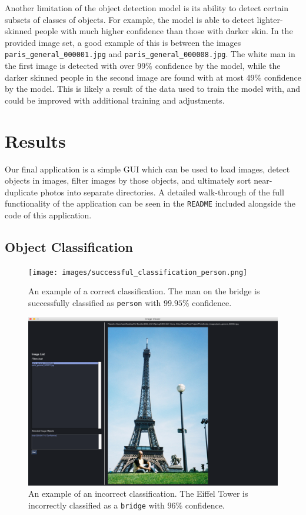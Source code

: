 \documentclass[12pt]{article}
\begin{document}
	Another limitation of the object detection model is its ability to detect certain subsets of classes of objects. For example, the model is able to detect lighter-skinned people with much higher confidence than those with darker skin. In the provided image set, a good example of this is between the images \texttt{paris\_general\_000001.jpg} and \texttt{paris\_general\_000008.jpg}. The white man in the first image is detected with over 99\% confidence by the model, while the darker skinned people in the second image are found with at most 49\% confidence by the model. This is likely a result of the data used to train the model with, and could be improved with additional training and adjustments.
	
\section{Results}

Our final application is a simple GUI which can be used to load images, detect objects in images, filter images by those objects, and ultimately sort near-duplicate photos into separate directories. A detailed walk-through of the full functionality of the application can be seen in the \texttt{README} included alongside the code of this application.


\subsection{Object Classification}
\begin{figure}[H]
	\centering
	\texttt{[image: images/successful\_classification\_person.png]}
	\caption{An example of a correct classification. The man on the bridge is successfully classified as \texttt{person} with $99.95\%$ confidence.}
\end{figure}


\begin{figure}[H]
	\centering
	\includegraphics[width=.9\textwidth]{images/incorrect_classification_boat.png}
	\caption{An example of an incorrect classification. The Eiffel Tower is incorrectly classified as a \texttt{bridge} with $96\%$ confidence.}
\end{figure}
\end{document}
